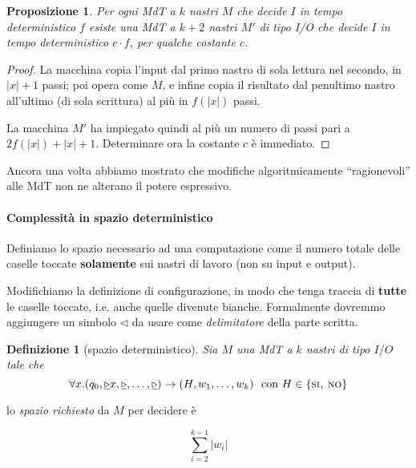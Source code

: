\documentclass[a4paper,10pt,oneside]{article}
\theoremstyle{break}
\newtheorem{deff}{Definizione}[section]
\newtheorem{prop}{Proposizione}[subsection]
\begin{document}
\begin{mdframed}


\begin{prop}
 Per ogni MdT a $k$ nastri $M$ che decide $I$ in tempo deterministico $f$ esiste una MdT a $k+2$ nastri $M'$ di tipo I/O che decide $I$ in tempo deterministico $c\cdot f$, per qualche costante $c$.
\end{prop}

\dotfill

\begin{proof}
 La macchina copia l'input dal primo nastro di sola lettura nel secondo, in $|x| + 1$ passi; poi opera come $M$, e infine copia il risultato dal penultimo nastro all'ultimo (di sola scrittura) al più in $f(|x|)$ passi. \smallskip

 La macchina $M'$ ha impiegato quindi al più un numero di passi pari a $2 f(|x|) + |x| + 1$. Determinare ora la costante $c$ è immediato.


\end{proof}

\end{mdframed}

Ancora una volta abbiamo mostrato che modifiche algoritmicamente ``ragionevoli'' alle MdT non ne alterano il potere espressivo.

\paragraph{Complessità in spazio deterministico}

Definiamo lo spazio necessario ad una computazione come il numero totale delle caselle toccate \textbf{solamente} sui nastri di lavoro (non su input e output).\smallskip

Modifichiamo la definizione di configurazione, in modo che tenga traccia di \textbf{tutte} le caselle toccate, i.e. anche quelle divenute bianche. Formalmente dovremmo aggiungere un simbolo $\triangleleft$ da usare come \emph{delimitatore} della parte scritta.

\begin{deff}[spazio deterministico]
\label{spazio_det}
Sia $M$ una MdT a $k$ nastri di tipo $I/O$ tale che \[\forall x . (q_0, \underline{\triangleright} x,\underline{\triangleright},\hdots,\underline{\triangleright}) \to (H, w_1, \hdots, w_k)\,\,\text{ con }H \in \{\textsc{si, no}\}\]
\end{deff}
lo \emph{spazio richiesto} da $M$ per decidere è

\[ \sum_{i = 2}^{k-1} |w_i| \]
\end{document}
